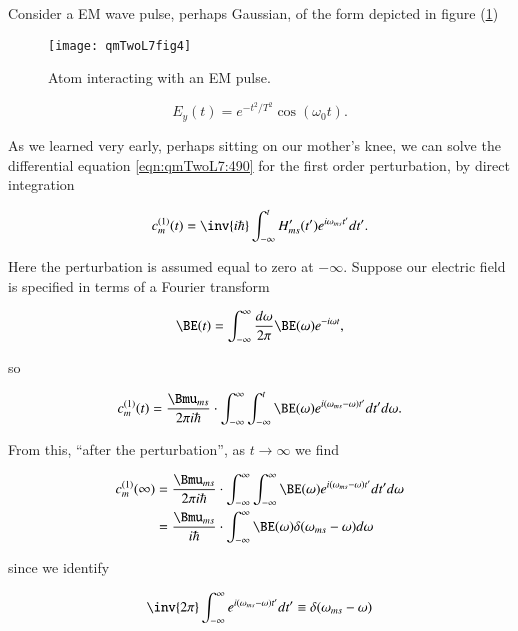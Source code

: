 Consider a EM wave pulse, perhaps Gaussian, of the form depicted in figure (\ref{fig:qmTwoL7fig4})

\begin{figure}[htp]
\centering
\texttt{[image: qmTwoL7fig4]}
\caption{Atom interacting with an EM pulse.}\label{fig:qmTwoL7fig4}
\end{figure}

\begin{equation}\label{eqn:qmTwoL7:590}
E_y(t) = e^{-t^2/T^2} \cos(\omega_0 t).
\end{equation}

As we learned very early, perhaps sitting on our mother's knee, we can solve the differential equation \ref{eqn:qmTwoL7:490} for the first order perturbation, by direct integration

\begin{equation}\label{eqn:qmTwoL7:510}
c_m^{(1)}(t) =
\inv{i \hbar} \int_{-\infty}^t
H_{ms}'(t') e^{i \omega_{ms} t'} dt'.
\end{equation}

Here the perturbation is assumed equal to zero at $-\infty$.  Suppose our electric field is specified in terms of a Fourier transform

\begin{equation}\label{eqn:qmTwoL7:530}
\BE(t) = \int_{-\infty}^\infty \frac{d \omega}{2\pi} \BE(\omega) e^{-i \omega t},
\end{equation}

so

\begin{equation}\label{eqn:qmTwoL7:550}
c_m^{(1)}(t) =
\frac{\Bmu_{ms}}{2 \pi i \hbar} \cdot
\int_{-\infty}^\infty
\int_{-\infty}^t
\BE(\omega)
e^{i (\omega_{ms} -\omega) t'} dt' d\omega.
\end{equation}

From this, ``after the perturbation'', as $t \rightarrow \infty$ we find

\begin{align*}
c_m^{(1)}(\infty)
&=
\frac{\Bmu_{ms}}{2 \pi i \hbar} \cdot
\int_{-\infty}^\infty
\int_{-\infty}^\infty
\BE(\omega)
e^{i (\omega_{ms} -\omega) t'} dt' d\omega \\
&=
\frac{\Bmu_{ms}}{i \hbar} \cdot
\int_{-\infty}^\infty
\BE(\omega)
\delta(\omega_{ms} - \omega)
d\omega
\end{align*}

since we identify

\begin{equation}\label{eqn:qmTwoL7:570}
\inv{2 \pi}
\int_{-\infty}^\infty
e^{i (\omega_{ms} -\omega) t'} dt' \equiv \delta(\omega_{ms} - \omega)
\end{equation}

